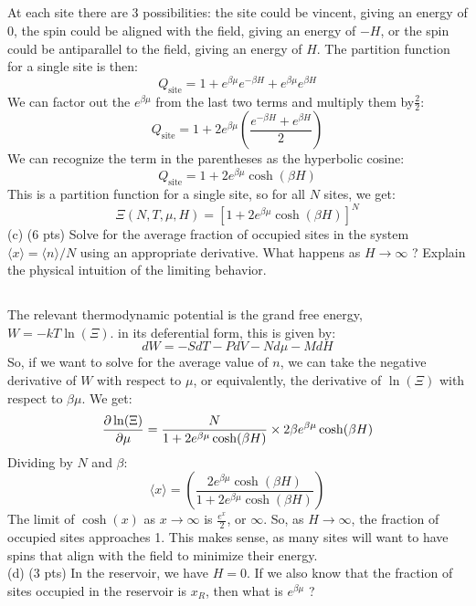 \documentclass[10pt]{article}
\begin{document}
\subsection{}
At each site there are 3 possibilities: the site could be vincent, giving an energy of 0, the spin could be aligned with the field, giving an energy of $-H$, or the spin could be antiparallel to the field, giving an energy of $H$. The partition function for a single site is then:
\begin{equation}
  Q_{\text{site}} = 1 + e^{\beta \mu} e^{-\beta H} + e^{\beta \mu} e^{\beta H}
\end{equation}
We can factor out the $e^{\beta \mu}$ from the last two terms and multiply them by$\frac{2}{2}$:
\begin{equation}
  Q_{\text{site}} = 1 + 2 e^{\beta \mu}\left( \frac{e^{-\beta H} + e^{\beta H}}{2} \right)
\end{equation}
We can recognize the term in the parentheses as the hyperbolic cosine:
\begin{equation}
  Q_{\text{site}} = 1 + 2 e^{\beta \mu} \cosh(\beta H)
\end{equation}
This is a partition function for a single site, so for all $N$ sites, we get:
\begin{equation}
  \Xi(N, T, \mu, H) = \left[1 + 2 e^{\beta \mu} \cosh(\beta H) \right]^N
\end{equation}
(c) (6 pts) Solve for the average fraction of occupied sites in the system $\langle x\rangle=\langle n\rangle / N$ using an appropriate derivative. What happens as $H \rightarrow \infty$ ? Explain the physical intuition of the limiting behavior.
\subsection{}
The relevant thermodynamic potential is the grand free energy, $W = -kT \ln(\Xi)$. in its deferential form, this is given by:
\begin{equation}
  dW = -S dT - P dV - N d\mu - M dH
\end{equation}
So, if we want to solve for the average value of $n$, we can take the negative derivative of $W$ with respect to $\mu$, or equivalently, the derivative of $\ln(\Xi)$ with respect to $\beta\mu$. We get:
\begin{equation}
  \pdv{\ln(\Xi)}{\mu} = \frac{N}{1+2e^{\beta\mu}\cosh(\beta H)} \times 2\beta e^{\beta\mu}\cosh(\beta H)
\end{equation}
Dividing by $N$ and $\beta$:
\begin{equation}
  \langle x \rangle = \left( \frac{2e^{\beta\mu}\cosh(\beta H)}{1+2e^{\beta\mu}\cosh(\beta H)} \right)
\end{equation}
The limit of $\cosh(x)$ as $x \rightarrow \infty$ is $\frac{e^x}{2}$, or $\infty$. So, as $H \rightarrow \infty$, the fraction of occupied sites approaches 1. This makes sense, as many sites will want to have spins that align with the field to minimize their energy.\\
(d) (3 pts) In the reservoir, we have $H=0$. If we also know that the fraction of sites occupied in the reservoir is $x_{R}$, then what is $e^{\beta \mu}$ ?
\end{document}
